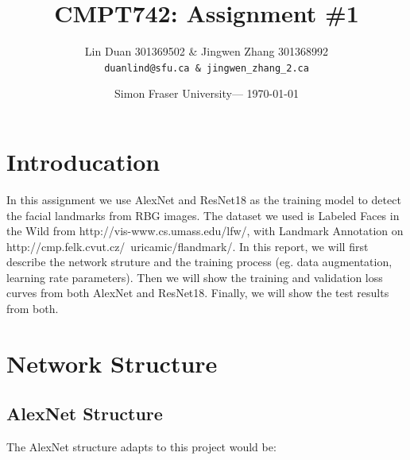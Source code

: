 \documentclass{article}
\title{CMPT742: Assignment \#1} %
\author{Lin Duan 301369502 \& Jingwen Zhang 301368992\\ \texttt{duanlind@sfu.ca \& jingwen\_zhang\_2\@sfu.ca}} %
\date{Simon Fraser University--- \today} %
\begin{document}
\maketitle %


\section*{Introducation} %

In this assignment we use AlexNet and ResNet18 as the training model to detect the facial landmarks from RBG images. The dataset we used is Labeled Faces in the Wild from http://vis-www.cs.umass.edu/lfw/, with Landmark Annotation on http://cmp.felk.cvut.cz/~uricamic/flandmark/. In this report, we will first describe the network struture and the training process (eg. data augmentation, learning rate parameters). Then we will show the training and validation loss curves from both AlexNet and ResNet18. Finally, we will show the test results from both.


\section{Network Structure} %




\subsection{AlexNet Structure}

The AlexNet structure adapts to this project would be:
\end{document}
